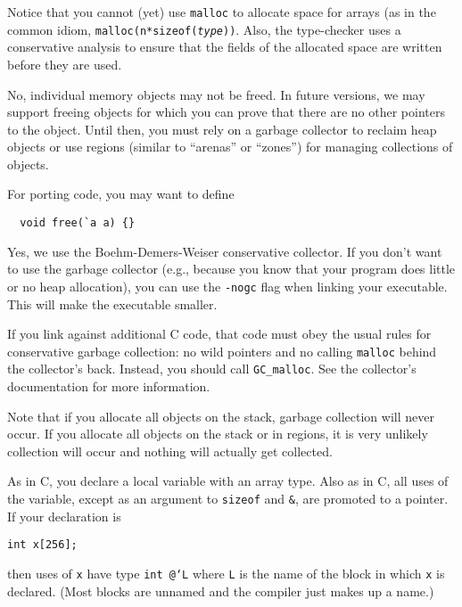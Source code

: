 Notice that you cannot (yet) use \texttt{malloc} to allocate space for
arrays (as in the common idiom, \texttt{malloc(n*sizeof({\it type}))}.
Also, the type-checker uses a conservative analysis to ensure that the
fields of the allocated space are written before they are used.


No, individual memory objects may not be freed.  In future versions,
we may support freeing objects for which you can prove that there are
no other pointers to the object.  Until then, you must rely on a
garbage collector to reclaim heap objects or use regions (similar to
``arenas'' or ``zones'') for managing collections of objects.

For porting code, you may want to define
\begin{verbatim}
  void free(`a a) {}
\end{verbatim}


Yes, we use the Boehm-Demers-Weiser conservative collector.  If you
don't want to use the garbage collector (e.g., because you know that
your program does little or no heap allocation), you can use the
\texttt{-nogc} flag when linking your executable.  This will make the
executable smaller.

If you link against additional C code, that code must obey the usual
rules for conservative garbage collection: no wild pointers and no
calling \texttt{malloc} behind the collector's back.  Instead, you
should call \texttt{GC_malloc}.  See the collector's documentation for
more information.

Note that if you allocate all objects on the stack, garbage collection
will never occur.  If you allocate all objects on the stack or in
regions, it is very unlikely collection will occur and nothing will
actually get collected.


As in C, you declare a local variable with an array type.  Also as in
C, all uses of the variable, except as an argument to \texttt{sizeof}
and \texttt{\&}, are promoted to a pointer.  If your declaration is
\begin{verbatim}
int x[256];
\end{verbatim}
then uses of \texttt{x} have type \texttt{int @`L\rb} where
\texttt{L} is the name of the block in which \texttt{x} is declared.
(Most blocks are unnamed and the compiler just makes up a name.)

